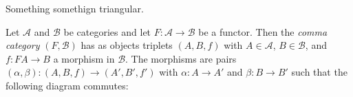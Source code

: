 Something somethign triangular.

\begin{defn}
	Let $\mathcal A$ and $\mathcal B$ be categories and let $F\colon\mathcal A \to \mathcal B$ be a functor. Then the \emph{comma category} $(F, \mathcal  B)$ has as objects triplets $(A, B, f)$ with $A \in \mathcal  A$, $B \in \mathcal  B$, and $f\colon FA \to B$ a morphism in $\mathcal  B$. The morphisms are pairs $(\alpha, \beta)\colon(A, B, f) \to (A', B', f')$ with $\alpha\colon A \to A'$ and $\beta\colon B \to B'$ such that the following diagram commutes:
	\begin{center}
	\end{center}
\end{defn}

